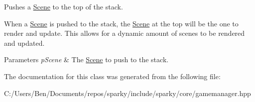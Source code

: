 Pushes a \hyperlink{classsparky_1_1_scene}{Scene} to the top of the stack. 

When a \hyperlink{classsparky_1_1_scene}{Scene} is pushed to the stack, the \hyperlink{classsparky_1_1_scene}{Scene} at the top will be the one to render and update. This allows for a dynamic amount of scenes to be rendered and updated.


\begin{DoxyParams}{Parameters}
{\em p\+Scene} & The \hyperlink{classsparky_1_1_scene}{Scene} to push to the stack. \\
\hline
\end{DoxyParams}


The documentation for this class was generated from the following file\+:\begin{DoxyCompactItemize}
\item 
C\+:/\+Users/\+Ben/\+Documents/repos/sparky/include/sparky/core/gamemanager.\+hpp\end{DoxyCompactItemize}
